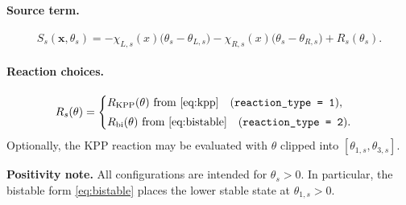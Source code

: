 \paragraph{Source term.}
\begin{equation}
S_s(\mathbf{x},\theta_s)
= -\chi_{L,s}(x)\big(\theta_s-\theta_{L,s}\big)
  -\chi_{R,s}(x)\big(\theta_s-\theta_{R,s}\big)
  + R_s(\theta_s).
\label{eq:sponge_react}
\end{equation}

\paragraph{Reaction choices.}
\[
R_s(\theta) =
\begin{cases}
R_{\mathrm{KPP}}(\theta) \text{ from \eqref{eq:kpp}} \quad (\texttt{reaction\_type = 1}),\\[1mm]
R_{\mathrm{bi}}(\theta) \text{ from \eqref{eq:bistable}} \quad (\texttt{reaction\_type = 2}).
\end{cases}
\]
Optionally, the KPP reaction may be evaluated with $\theta$ clipped into $[\theta_{1,s},\theta_{3,s}]$.

\vspace{2mm}
\noindent\textbf{Positivity note.}
All configurations are intended for $\theta_s>0$. In particular, the bistable form \eqref{eq:bistable} places the lower stable state at $\theta_{1,s}>0$.
